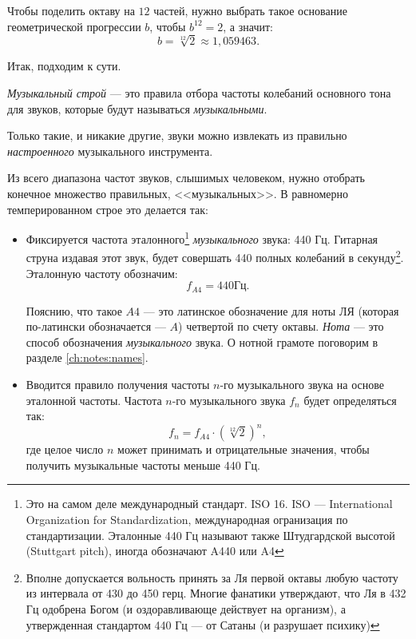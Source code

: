 Чтобы поделить октаву на $12$ частей, нужно выбрать такое основание геометрической прогрессии $b$, чтобы $b^{12} = 2$, а значит:
\[
    b = \sqrt[12]{2} \approx 1,059463.
\]

Итак, подходим к сути. 
\begin{Definition}
    \emph{Музыкальный строй} --- это правила отбора частоты колебаний основного тона для звуков, которые будут называться \emph{музыкальными}. 
\end{Definition}    

Только такие, и никакие другие, звуки можно извлекать из правильно \emph{настроенного} музыкального инструмента.

Из всего диапазона частот звуков, слышимых человеком, нужно отобрать конечное множество правильных, <<музыкальных>>. В равномерно темперированном строе это делается так:
\begin{itemize}
    \item Фиксируется частота эталонного\footnote{Это на самом деле международный стандарт. ISO 16. ISO --- International Organization for Standardization, международная огранизация по стандартизации. Эталонные 440 Гц называют также Штудгардской высотой (Stuttgart pitch), иногда обозначают A440 или A4} \emph{музыкального} звука: 440 Гц. Гитарная струна издавая этот звук, будет совершать 440 полных колебаний в секунду\footnote{Вполне допускается вольность принять за Ля первой октавы любую частоту из интервала от 430 до 450 герц. Многие фанатики утверждают, что Ля в 432 Гц одобрена Богом (и оздоравливающе действует на организм), а утвержденная стандартом 440 Гц --- от Сатаны (и разрушает психику)}. Эталонную частоту обозначим: 
    \[  
        f_{A4}=440\text{Гц}.
    \]
    
    Пояснию, что такое $A4$ --- это латинское обозначение для ноты ЛЯ (которая по-латински обозначается --- $A$) четвертой по счету октавы. \emph{Нота} --- это способ обозначения \emph{музыкального} звука. О нотной грамоте поговорим в разделе \ref{ch:notes:names}.
    
    \item Вводится правило получения частоты $n$-го музыкального звука на основе эталонной частоты. Частота $n$-го музыкального звука $f_n$ будет определяться так: 
    \begin{equation}
        f_n = f_{A4}\cdot({\sqrt[12]{2}})^n, \label{eq:music:tone:frequency}
    \end{equation}
    где целое число $n$ может принимать и отрицательные значения, чтобы получить музыкальные частоты меньше 440 Гц.
\end{itemize}

